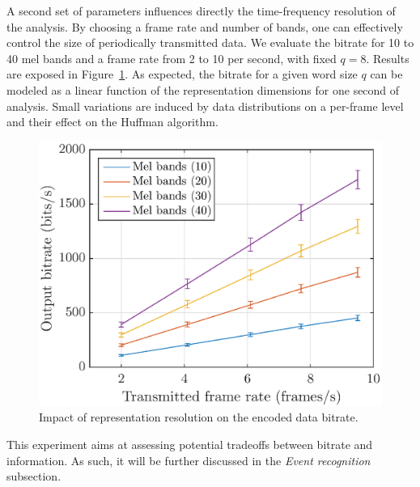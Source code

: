 \documentclass[final,3p,times,twocolumn]{elsarticle}
\begin{document}
A second set of parameters influences directly the time-frequency resolution of the analysis. By choosing a frame rate and number of bands, one can effectively control the size of periodically transmitted data. We evaluate the bitrate for 10 to 40 mel bands and a frame rate from 2 to 10 per second, with fixed $q = 8$. Results are exposed in Figure~\ref{fig:bitrate_mel_avg}. As expected, the bitrate for a given word size $q$ can be modeled as a linear function of the representation dimensions for one second of analysis. Small variations are induced by data distributions on a per-frame level and their effect on the Huffman algorithm.

\begin{figure}[htbp]
	\centering
		\includegraphics[width=\columnwidth]{figures/bitrate_mel_avg.eps}
	\caption{Impact of representation resolution on the encoded data bitrate.}
	\label{fig:bitrate_mel_avg}
\end{figure}

This experiment aims at assessing potential tradeoffs between bitrate and information. As such, it will be further discussed in the \textit{Event recognition} subsection.\\
\end{document}
